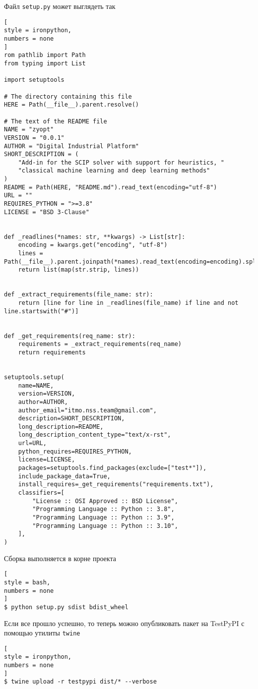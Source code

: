 \documentclass[%
	11pt,
	a4paper,
	utf8,
		]{article}
\begin{document}
Файл \verb|setup.py| может выглядеть так
\begin{lstlisting}[
style = ironpython,
numbers = none
]
rom pathlib import Path
from typing import List

import setuptools

# The directory containing this file
HERE = Path(__file__).parent.resolve()

# The text of the README file
NAME = "zyopt"
VERSION = "0.0.1"
AUTHOR = "Digital Industrial Platform"
SHORT_DESCRIPTION = (
	"Add-in for the SCIP solver with support for heuristics, "
	"classical machine learning and deep learning methods"
)
README = Path(HERE, "README.md").read_text(encoding="utf-8")
URL = ""
REQUIRES_PYTHON = ">=3.8"
LICENSE = "BSD 3-Clause"


def _readlines(*names: str, **kwargs) -> List[str]:
	encoding = kwargs.get("encoding", "utf-8")
	lines = Path(__file__).parent.joinpath(*names).read_text(encoding=encoding).splitlines()
	return list(map(str.strip, lines))


def _extract_requirements(file_name: str):
	return [line for line in _readlines(file_name) if line and not line.startswith("#")]


def _get_requirements(req_name: str):
	requirements = _extract_requirements(req_name)
	return requirements


setuptools.setup(
	name=NAME,
	version=VERSION,
	author=AUTHOR,
	author_email="itmo.nss.team@gmail.com",
	description=SHORT_DESCRIPTION,
	long_description=README,
	long_description_content_type="text/x-rst",
	url=URL,
	python_requires=REQUIRES_PYTHON,
	license=LICENSE,
	packages=setuptools.find_packages(exclude=["test*"]),
	include_package_data=True,
	install_requires=_get_requirements("requirements.txt"),
	classifiers=[
		"License :: OSI Approved :: BSD License",
		"Programming Language :: Python :: 3.8",
		"Programming Language :: Python :: 3.9",
		"Programming Language :: Python :: 3.10",
	],
)
\end{lstlisting}

Сборка выполняется в корне проекта
\begin{lstlisting}[
style = bash,
numbers = none
]
$ python setup.py sdist bdist_wheel
\end{lstlisting}

Если все прошло успешно, то теперь можно опубликовать пакет на TestPyPI с помощью утилиты \verb|twine|
\begin{lstlisting}[
style = ironpython,
numbers = none	
]
$ twine upload -r testpypi dist/* --verbose
\end{lstlisting}
\end{document}

